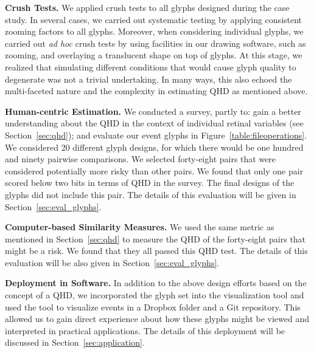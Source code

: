 \textbf{Crush Tests.} We applied crush tests to all glyphs designed during the case study.
In several cases, we carried out systematic testing by applying consistent zooming factors to all glyphs.
Moreover, when considering individual glyphs, we carried out \emph{ad hoc} crush tests by using facilities in our drawing software, such as zooming, and overlaying a translucent shape on top of glyphs.
At this stage, we realized that simulating different conditions that would cause glyph quality to degenerate was not a trivial undertaking.
In many ways, this also echoed the multi-faceted nature and the complexity in estimating QHD as mentioned above.

\textbf{Human-centric Estimation.} We conducted a survey, partly to: gain a better understanding about the QHD in the context of individual retinal variables (see Section~\ref{sec:qhd}); and evaluate our event glyphs in Figure~\ref{table:fileoperations}.
We considered 20 different glyph designs, for which there would be one hundred and ninety pairwise comparisons.
We selected forty-eight pairs that were considered potentially more risky than other pairs.
We found that only one pair scored below two bits in terms of QHD in the survey.
The final designs of the glyphs did not include this pair.
The details of this evaluation will be given in Section~\ref{sec:eval_glyphs}.

\textbf{Computer-based Similarity Measures.} We used the same metric as mentioned in Section~\ref{sec:qhd} to measure the QHD of the forty-eight pairs that might be a risk.
We found that they all passed this QHD test.
The details of this evaluation will be also given in Section~\ref{sec:eval_glyphs}.

\textbf{Deployment in Software.} In addition to the above design efforts based on the concept of a QHD, we incorporated the glyph set into the visualization tool and used the tool to visualize events in a Dropbox folder and a Git repository.
This allowed us to gain direct experience about how these glyphs might be viewed and interpreted in practical applications.
The details of this deployment will be discussed in Section~\ref{sec:application}.

